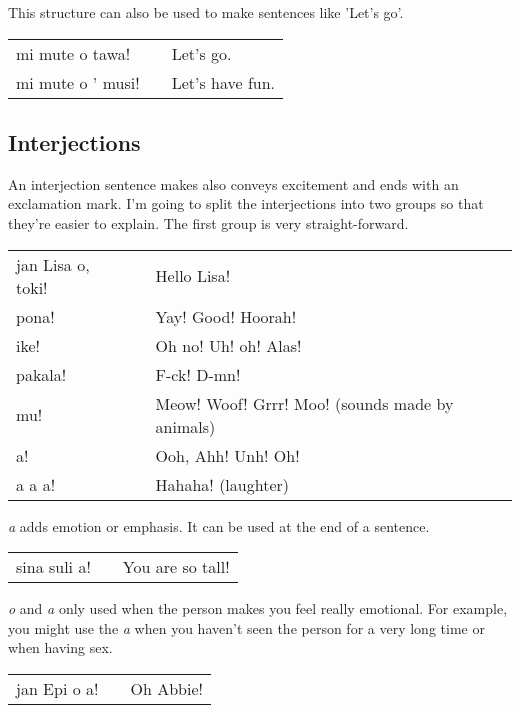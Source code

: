This structure can also be used to make sentences like 'Let's go'.

\begin{supertabular}{p{5,5cm}|ll}
mi mute o tawa! && Let's go. \\
mi mute o ' musi! && Let's have fun. \\
\end{supertabular} 
%
{}
\subsection*{Interjections}
%
An interjection sentence makes also conveys excitement and ends with an exclamation mark.
I'm going to split the interjections into two groups so that they're easier to explain. 
The first group is very straight-forward.

\begin{supertabular}{p{5,5cm}|ll}
jan Lisa o, toki! && Hello Lisa! \\
pona! && Yay! Good! Hoorah! \\
ike! && Oh no! Uh! oh! Alas! \\
pakala! && F-ck! D-mn! \\
mu! && Meow! Woof! Grrr! Moo! (sounds made by animals) \\
a! && Ooh, Ahh! Unh! Oh! \\
a a a! && Hahaha! (laughter) \\
\end{supertabular} 

\textit{a} adds emotion or emphasis. It can be used at the end of a sentence.

\begin{supertabular}{p{5,5cm}|ll}
sina suli a! && You are so tall! \\
\end{supertabular} 

\textit{o} and \textit{a} only used when the person makes you feel really emotional. 
For example, you might use the \textit{a} when you haven't seen the person for a very long time or when having sex.  

\begin{supertabular}{p{5,5cm}|ll}
jan Epi o a! && Oh Abbie! \\
\end{supertabular} 

